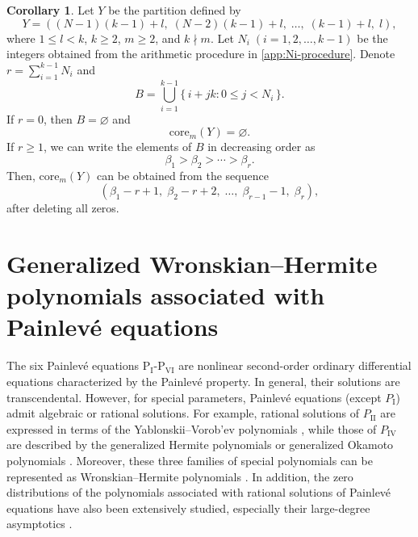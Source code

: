 \documentclass[preprint,3p,10pt]{elsarticle}
\theoremstyle{definition}
\newtheorem{corollary}[definition]{Corollary}
\begin{document}
\begin{corollary}
\label{cor:m-core-from-Ni}
Let \(Y\) be the partition defined by
\begin{equation}
Y=
\left((N-1)(k-1)+l,\; (N-2)(k-1)+l,\; \ldots,\; (k-1)+l,\; l\right),
\end{equation}
where \(1\le l<k\), \(k\ge2\),  \(m\ge2\),  and
\(k\nmid m\).
Let \(N_i\; (i=1,2,\ldots,k-1)\) be the integers obtained from the arithmetic procedure in \ref{app:Ni-procedure}. Denote $r=\sum_{i=1}^{k-1}N_i$ and
\begin{equation}
B=
\bigcup_{i=1}^{k-1}
\{\,i+jk: 0\le j<N_i\,\}.
\end{equation}
If \(r=0\), then \(B=\varnothing\) and
\begin{equation}
    \mathrm{core}_m(Y)=\varnothing.
\end{equation}
If \(r\ge1\), we can write the elements of \(B\) in decreasing order as
\begin{equation}
\beta_1>\beta_2>\cdots>\beta_r.
\end{equation}
Then, \(\mathrm{core}_m(Y)\) can be obtained from the sequence
\begin{equation}
(\beta_1-r+1,\; \beta_2-r+2,\; \ldots,\;\beta_{r-1}-1,\; \beta_r),
\end{equation}
after deleting all zeros.
\end{corollary}



\section{Generalized Wronskian--Hermite polynomials associated with Painlev\'e equations}
\label{sec:WH with Painleve}
The six Painlev\'e equations P\(_{\mathrm I}\)-P\(_{\mathrm {VI}}\) are nonlinear second-order ordinary differential equations characterized by the Painlev\'e property.
In general, their solutions are transcendental. 
However, for special parameters, Painlev\'e equations (except \(P_{\mathrm I}\)) admit algebraic or rational solutions. For example, rational solutions of \(P_{\mathrm{II}}\) are expressed in terms of the Yablonskii--Vorob'ev polynomials \cite{Vorobev1965RationalPII,Yablonskii1959RationalPII}, while those of \(P_{\mathrm{IV}}\) are described by the generalized Hermite polynomials or generalized Okamoto polynomials \cite{Okamoto1986StudiesPainleveIII,noumi1999symmetries}. Moreover, these three families of special polynomials can be represented as Wronskian--Hermite polynomials \cite{clarkson2003second,clarkson2003fourth,KajiwaraOhta1996PII,KajiwaraOhta1998PIV}. In addition, the zero distributions of the polynomials associated with rational solutions of Painlev\'e equations have also been extensively studied, especially their large-degree asymptotics \cite{BuckinghamMiller2014PII,BuckinghamMiller2015PIICritical,bertola2015zeros,buckingham2020large,BothnerMiller2020PIIIAsymptotics,BuckinghamMiller2022PIVIsomonodromy,BalogounBertola2025PVHankel}.
\end{document}
